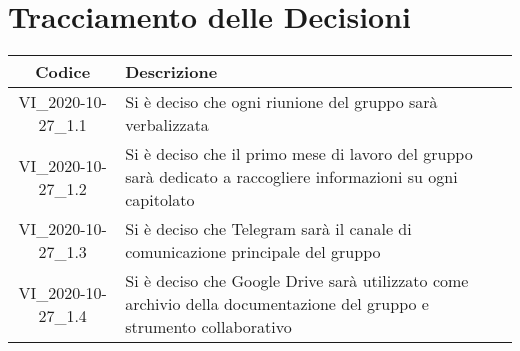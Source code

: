 \section*{Tracciamento delle Decisioni}

\begin{center}
	\begin{longtable}{|c|p{12.25cm}|}
	\hline
	\rowcolor{lighter-grayer}
	\textbf{Codice} & \textbf{Descrizione} \\
	\hline
	\endfirsthead
	
	\hline
	VI\_2020-10-27\_1.1 & Si è deciso che ogni riunione del gruppo sarà verbalizzata  \\
	\hline
	VI\_2020-10-27\_1.2 & Si è deciso che il primo mese di lavoro del gruppo sarà dedicato a raccogliere informazioni su ogni capitolato  \\
	\hline
	VI\_2020-10-27\_1.3 & Si è deciso che Telegram sarà il canale di comunicazione principale del gruppo \\
	\hline
	VI\_2020-10-27\_1.4 & Si è deciso che Google Drive sarà utilizzato come archivio della documentazione del gruppo e strumento collaborativo \\
	\hline
	\end{longtable}
\end{center}